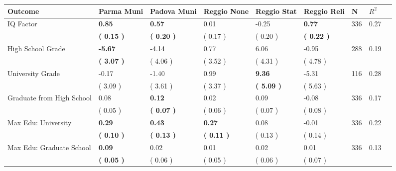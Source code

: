 \begin{tabular}{L{6.2cm} C{1.8cm} C{1.8cm} C{1.8cm} C{1.8cm} C{1.8cm} C{1.8cm} C{0.3cm} C{0.3cm}}
\toprule
 \textbf{Outcome} & \textbf{Parma Muni} & \textbf{Padova Muni} & \textbf{Reggio None} & \textbf{Reggio Stat} & \textbf{Reggio Reli} & \textbf{N} & \textbf{$ R^2$} \\
\midrule
IQ Factor & \textbf{     0.85} & \textbf{     0.57} &      0.01 &     -0.25 & \textbf{     0.77}  & 336 &       0.27 \\ 
 & \textbf{(     0.15 )} & \textbf{(     0.20 )} & (     0.17 ) & (     0.20 ) & \textbf{(     0.22 )}  & \\
High School Grade & \textbf{    -5.67} &     -4.14 &      0.77 &      6.06 &     -0.95  & 288 &       0.19 \\ 
 & \textbf{(     3.07 )} & (     4.06 ) & (     3.52 ) & (     4.31 ) & (     4.78 )  & \\
University Grade &     -0.17 &     -1.40 &      0.99 & \textbf{     9.36} &     -5.31  & 116 &       0.28 \\ 
 & (     3.09 ) & (     3.61 ) & (     3.37 ) & \textbf{(     5.09 )} & (     5.63 )  & \\
Graduate from High School &      0.08 & \textbf{     0.12} &      0.02 &      0.09 &     -0.08  & 336 &       0.17 \\ 
 & (     0.05 ) & \textbf{(     0.07 )} & (     0.06 ) & (     0.07 ) & (     0.08 )  & \\
Max Edu: University & \textbf{     0.29} & \textbf{     0.43} & \textbf{     0.27} &      0.08 &     -0.01  & 336 &       0.22 \\ 
 & \textbf{(     0.10 )} & \textbf{(     0.13 )} & \textbf{(     0.11 )} & (     0.13 ) & (     0.14 )  & \\
Max Edu: Graduate School & \textbf{     0.09} &      0.02 &      0.01 &      0.02 &      0.01  & 336 &       0.13 \\ 
 & \textbf{(     0.05 )} & (     0.06 ) & (     0.05 ) & (     0.06 ) & (     0.07 )  & \\
\bottomrule
\end{tabular}
